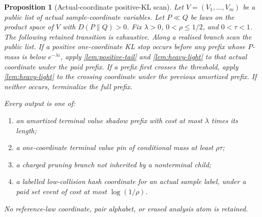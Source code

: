 \documentclass[11pt]{article}
\newcommand{\Cref}[1]{\ref{#1}}
\newtheorem{proposition}[theorem]{Proposition}
\theoremstyle{remark}
\begin{document}
\begin{proposition}[Actual-coordinate positive-KL scan]\label{prop:positive-kl-scan}
Let $V=(V_1,\ldots,V_m)$ be a public list of actual sample-coordinate variables.  Let $P\ll Q$ be laws on the product space of $V$ with $D(P\|Q)>0$.  Fix $\lambda>0$, $0<\rho\le 1/2$, and $0<\tau<1$.  The following retained transition is exhaustive.  Along a realised branch scan the public list.  If a positive one-coordinate KL stop occurs before any prefix whose $P$-mass is below $e^{-\lambda i}$, apply \Cref{lem:positive-tail} and \Cref{lem:heavy-light} to that actual coordinate under the paid prefix.  If a prefix first crosses the threshold, apply \Cref{lem:heavy-light} to the crossing coordinate under the previous amortized prefix.  If neither occurs, terminalize the full prefix.

Every output is one of:
\begin{enumerate}[label=\textup{(\roman*)}]
\item an amortized terminal value shadow prefix with cost at most $\lambda$ times its length;
\item a one-coordinate terminal value pin of conditional mass at least $\rho\tau$;
\item a charged pruning branch not inherited by a nonterminal child;
\item a labelled low-collision hash coordinate for an actual sample label, under a paid set event of cost at most $\log(1/\rho)$.
\end{enumerate}
No reference-law coordinate, pair alphabet, or erased analysis atom is retained.
\end{proposition}
\end{document}
